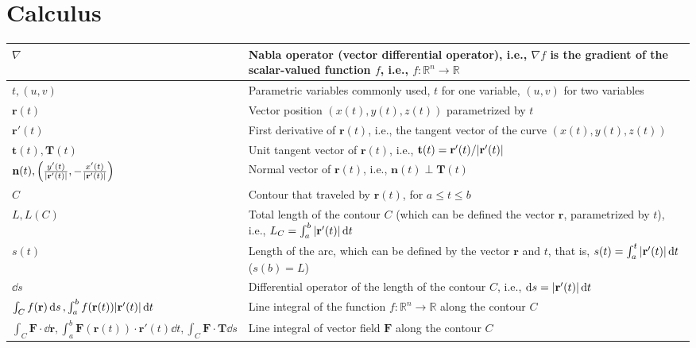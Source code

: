 \documentclass{article}
\begin{document}
\section{Calculus}
\begin{xltabular}{\textwidth}{XX}
    \(\nabla\) & Nabla operator (vector differential operator), i.e., \(\nabla f\) is the gradient of the scalar-valued function \(f\), i.e., \(f: \mathbb{R}^n \rightarrow \mathbb{R}\) \\ \hline
    \(t, (u,v)\) & Parametric variables commonly used, \(t\) for one variable, \((u,v)\) for two variables\\ \hline
    \(\mathbf{r}(t)\) & Vector position \((x(t), y(t), z(t))\) parametrized by \(t\)\\ \hline
    \(\mathbf{r}'(t)\) & First derivative of \(\mathbf{r}(t)\), i.e., the tangent vector of the curve \((x(t), y(t), z(t))\) \\ \hline
    \(\mathbf{t}(t),\mathbf{T}(t)\) & Unit tangent vector of \(\mathbf{r}(t)\), i.e., \newline  \(\mathbf{t}(t) = \mathbf{r}'(t)/\abs{\mathbf{r}'(t)}\)\\ \hline
    \(\mathbf{n}(t), \left( \frac{y'(t)}{\abs{\mathbf{r}'(t)}}, -\frac{x'(t)}{\abs{\mathbf{r}'(t)}} \right)\) & Normal vector of \(\mathbf{r}(t)\), i.e., \newline \(\mathbf{n}(t)\perp \mathbf{T}(t) \)\\ \hline
    \(C\)& Contour that traveled by \(\mathbf{r}(t)\), for \(a \leq t \leq b\) \\ \hline
    \(L, L(C)\) & Total length of the contour \(C\) (which can be defined the vector \(\mathbf{r}\), parametrized by \(t\)), i.e., \(L_C = \int_a^b \abs{\mathbf{r}'(t)} \dd{t}\)\\ \hline
    \(s(t)\) & Length of the arc, which can be defined by the vector \(\mathbf{r}\) and \(t\), that is, \(s(t) = \int_a^t \abs{\mathbf{r}'(t)} \dd{t}\) (\(s(b) = L\))\cite{stewartCalculus2011}\\ \hline
    \(\dd{s}\) & Differential operator of the length of the contour \(C\), i.e., \(\dd{s} = \abs{\mathbf{r}'(t)} \dd{t}\)\\ \hline
    \(\int_C f(\mathbf{r}) \dd{s}, \int_a^b f(\mathbf{r}(t)) \abs{\mathbf{r}'(t)} \dd{t}\) & Line integral of the function \(f: \mathbb{R}^{n} \rightarrow \mathbb{R}\) along the contour \(C\) \cite{apostolCalculus2ndEdn1967,stewartCalculus2011} \\ \hline
    \(\int_C \mathbf{F}\cdot\dd{\mathbf{r}}, \int_a^b \mathbf{F}(\mathbf{r}(t)) \cdot \mathbf{r}'(t) \dd{t}, \int_C \mathbf{F}\cdot\mathbf{T} \dd{s}\) & Line integral of vector field \(\mathbf{F}\) along the contour \(C\)  \cite{apostolCalculus2ndEdn1967,stewartCalculus2011} \\ \hline

\end{xltabular}
\end{document}
